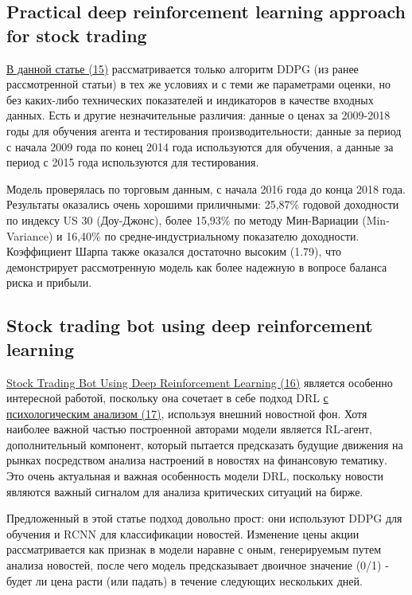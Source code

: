 \documentclass[a4paper,14pt]{extarticle}
\newcommand{\bibref}[3]{\hyperlink{#1}{#2 (#3)}} %
\begin{document}
\subsection{Practical deep reinforcement learning approach for stock trading}

\bibref{15}{В данной статье}{15} рассматривается только алгоритм DDPG (из ранее рассмотренной статьи) в тех же условиях и с теми же параметрами оценки, но без каких-либо технических показателей и индикаторов в качестве входных данных. Есть и другие незначительные различия: данные о ценах за 2009-2018 годы для обучения агента и тестирования производительности; данные за период с начала 2009 года по конец 2014 года используются для обучения, а данные за период с 2015 года используются для тестирования.

Модель проверялась по торговым данным, с начала 2016 года до конца 2018 года. Результаты оказались очень хорошими приличными: 25,87\% годовой доходности по индексу US 30 (Доу-Джонс), более 15,93\% по методу Мин-Вариации (Min-Variance) и 16,40\% по средне-индустриальному показателю доходности. Коэффициент Шарпа также оказался достаточно высоким (1.79), что демонстрирует рассмотренную модель как более надежную в вопросе баланса риска и прибыли.

\subsection{Stock trading bot using deep reinforcement learning}

\bibref{16}{Stock Trading Bot Using Deep Reinforcement Learning}{16} является особенно интересной работой, поскольку она сочетает в себе подход DRL \bibref{17}{с психологическим анализом}{17}, используя внешний новостной фон. Хотя наиболее важной частью построенной авторами модели является RL-агент, дополнительный компонент, который пытается предсказать будущие движения на рынках посредством анализа настроений в новостях на финансовую тематику. Это очень актуальная и важная особенность модели DRL, поскольку новости являются важный сигналом для анализа критических ситуаций на бирже. 

Предложенный в этой статье подход довольно прост: они используют DDPG для обучения и RCNN для классификации новостей. Изменение цены акции рассматривается как признак в модели наравне с оным, генерируемым путем анализа новостей, после чего модель предсказывает двоичное значение (0/1) - будет ли цена расти (или падать) в течение следующих нескольких дней.
\end{document}
